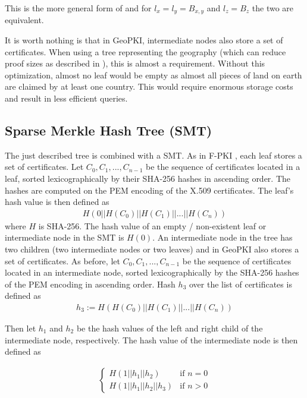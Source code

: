 \documentclass[10pt,conference,compsocconf]{IEEEtran}
\begin{document}
This is the more general form of  and for $l_x = l_y = B_{x,y}$ and $l_z = B_z$ the two are equivalent.

It is worth nothing is that in GeoPKI, intermediate nodes also store a set of certificates.
When using a tree representing the geography (which can reduce proof sizes as described in ), this is almost a requirement.
Without this optimization, almost no leaf would be empty as almost all pieces of land on earth are claimed by at least one country.
This would require enormous storage costs and result in less efficient queries.

\subsection{Sparse Merkle Hash Tree (SMT)}
\label{sec:data-structure:SMT}

The just described tree is combined with a SMT.
As in F-PKI \cite{chuat_f-pki_2022}, each leaf stores a set of certificates.
Let $C_0, C_1, ..., C_{n-1}$ be the sequence of certificates located in a leaf, sorted lexicographically by their SHA-256 hashes in ascending order.
The hashes are computed on the PEM encoding of the X.509 certificates.
The leaf's hash value is then defined as
\begin{align}
	\label{eq:hash-leaf}
	H(0 || H(C_0) || H(C_1) || ... || H(C_n))
\end{align}
where $H$ is SHA-256.
The hash value of an empty / non-existent leaf or intermediate node in the SMT is $H(0)$.
An intermediate node in the tree has two children (two intermediate nodes or two leaves) and in GeoPKI also stores a set of certificates.
As before, let $C_0, C_1, ..., C_{n-1}$ be the sequence of certificates located in an intermediate node, sorted lexicographically by the SHA-256 hashes of the PEM encoding in ascending order.
Hash $h_3$ over the list of certificates is defined as
\begin{align}
	\label{eq:hash-certs-intermediate-node}
	h_3 := H(H(C_0) || H(C_1) || ... || H(C_n))
\end{align}

Then let $h_1$ and $h_2$ be the hash values of the left and right child of the intermediate node, respectively.
The hash value of the intermediate node is then defined as

\begin{align}
	\label{eq:hash-intermediate-node}
	\left\{
	\begin{array}{lr}
		H(1 || h_1 || h_2) & \text{if $n = 0$}\\
		H(1 || h_1 || h_2 || h_3) & \text{if $n > 0$}
	\end{array}\right.
\end{align}
\end{document}

